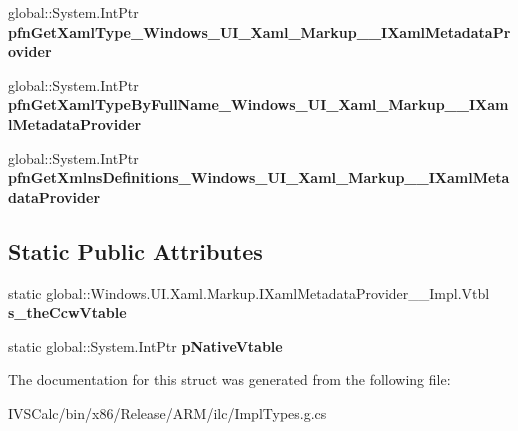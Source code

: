 \begin{DoxyCompactItemize}
\mbox{\label{struct_windows_1_1_u_i_1_1_xaml_1_1_markup_1_1_i_xaml_metadata_provider_____impl_1_1_vtbl_a8304df5c444bdc09ccdebdbd60f5d43e}} 
global\+::\+System.\+Int\+Ptr {\bfseries pfn\+Get\+Xaml\+Type\+\_\+\+Windows\+\_\+\+U\+I\+\_\+\+Xaml\+\_\+\+Markup\+\_\+\+\_\+\+I\+Xaml\+Metadata\+Provider}
\item 
\mbox{\label{struct_windows_1_1_u_i_1_1_xaml_1_1_markup_1_1_i_xaml_metadata_provider_____impl_1_1_vtbl_a463b8f235f7d1c3914003ed7c73163db}} 
global\+::\+System.\+Int\+Ptr {\bfseries pfn\+Get\+Xaml\+Type\+By\+Full\+Name\+\_\+\+Windows\+\_\+\+U\+I\+\_\+\+Xaml\+\_\+\+Markup\+\_\+\+\_\+\+I\+Xaml\+Metadata\+Provider}
\item 
\mbox{\label{struct_windows_1_1_u_i_1_1_xaml_1_1_markup_1_1_i_xaml_metadata_provider_____impl_1_1_vtbl_a44f0e441fbcbba3facd014f8e78c2f92}} 
global\+::\+System.\+Int\+Ptr {\bfseries pfn\+Get\+Xmlns\+Definitions\+\_\+\+Windows\+\_\+\+U\+I\+\_\+\+Xaml\+\_\+\+Markup\+\_\+\+\_\+\+I\+Xaml\+Metadata\+Provider}
\end{DoxyCompactItemize}
\subsection*{Static Public Attributes}
\begin{DoxyCompactItemize}
\item 
\mbox{\label{struct_windows_1_1_u_i_1_1_xaml_1_1_markup_1_1_i_xaml_metadata_provider_____impl_1_1_vtbl_a9e64a152d7ba557a745921cee055927d}} 
static global\+::\+Windows.\+U\+I.\+Xaml.\+Markup.\+I\+Xaml\+Metadata\+Provider\+\_\+\+\_\+\+Impl.\+Vtbl {\bfseries s\+\_\+the\+Ccw\+Vtable}
\item 
\mbox{\label{struct_windows_1_1_u_i_1_1_xaml_1_1_markup_1_1_i_xaml_metadata_provider_____impl_1_1_vtbl_adf5b51a4f4aa956f9b3a625f38229794}} 
static global\+::\+System.\+Int\+Ptr {\bfseries p\+Native\+Vtable}
\end{DoxyCompactItemize}


The documentation for this struct was generated from the following file\+:\begin{DoxyCompactItemize}
\item 
I\+V\+S\+Calc/bin/x86/\+Release/\+A\+R\+M/ilc/Impl\+Types.\+g.\+cs\end{DoxyCompactItemize}
